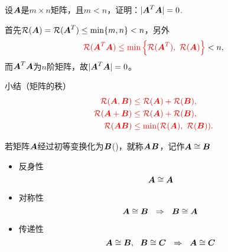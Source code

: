 \begin{frame}
\begin{li}
  设$\MA$是$m\times n$矩阵，且$m<n$，证明：$|\MA^T\MA|=0$.
\end{li} \pause 
\begin{jie}
  首先$\rank(\MA)=\rank(\MA^T)\le \min\{m,n\}<n$，另外
  $$
  \red{\rank(\MA^T\MA) \le \min\left\{\rank(\MA^T),~\rank(\MA)\right\}} < n,
  $$
而$\MA^T\MA$为$n$阶矩阵，故$|\MA^T\MA|=0$。
\end{jie}
\end{frame}


\begin{frame}
  \begin{center}
    小结（矩阵的秩）
    $$
    \red{
      \begin{aligned}
        \rank(\MA,\MB) &\le \rank(\MA)+\rank(\MB),\\
        \rank(\MA+\MB) &\le \rank(\MA)+\rank(\MB),\\
        \rank(\MA\MB)  &\le \min(\rank(\MA),~\rank(\MB)).
      \end{aligned}
    }
    $$
  \end{center}
\end{frame}


\begin{frame}
\begin{dingyi}[矩阵的相抵]
  若矩阵$\MA$经过初等变换化为$\MB$()，就称$\MA$$\MB$，记作$\MA\cong\MB$
\end{dingyi}

\begin{xingzhi}[相抵关系的性质]
  \begin{itemize}
  \item 反身性
    $$
    \MA\cong\MA
    $$
  \item 对称性
    $$
    \MA\cong\MB ~~\Rightarrow~~ \MB\cong\MA
    $$
  \item 传递性
    $$
    \MA\cong\MB,~~\MB\cong\MC ~~\Rightarrow~~ \MA\cong\MC
    $$
  \end{itemize}
\end{xingzhi}
\end{frame}



